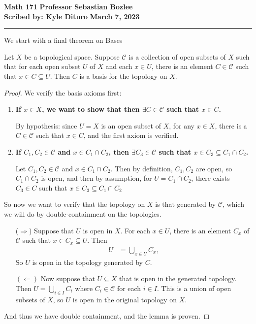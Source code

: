 \documentclass[12pt, twosided]{article}
\begin{document}
\noindent \textbf{Math 171} \hfill \textbf{Professor Sebastian Bozlee} \\
\textbf{Scribed by: Kyle Dituro} \hfill \textbf{March 7, 2023}\hrule
\vspace{.2in}

We start with a final theorem on Bases

\begin{lm}
  Let \(X\) be a topological space. Suppose \(\mathcal{C}\) is a collection of open subsets of \(X\) such that for each open subset \(U\) of \(X\) and each \(x \in U\), there is an element \(C \in \mathcal{C}\) such that \(x \in C \subseteq U\). Then \(C\) is a basis for the topology on \(X\).
\end{lm}
\begin{proof}
  We verify the basis axioms first:
  \begin{enumerate}
  \item \textbf{If \(x \in X\), we want to show that then \(\exists C \in \mathcal{C}\) such that \(x \in C\).}
    
    By hypothesis: since \(U = X\) is an open subset of \(X\), for any \(x \in X\), there is a \(C \in \mathcal{C}\) such that \(x \in C\), and the first axiom is verified.
    
  \item \textbf{If \(C_1, C_2 \in \mathcal{C}\) and \(x \in C_1 \cap C_2\), then \(\exists C_3 \in \mathcal{C}\) such that \(x \in C_3 \subseteq C_1 \cap C_2\).}

    Let \(C_1, C_2 \in \mathcal{C}\) and \(x \in C_1 \cap C_2\). Then by definition, \(C_1, C_2\) are open, so \(C_1 \cap C_2\) is open, and then by assumption, for \(U = C_1 \cap C_2\), there exists \(C_3 \in C\) such that \(x \in C_3 \subseteq C_1 \cap C_2\)
  \end{enumerate} \partdone

  So now we want to verify that the topology on \(X\) is that generated by \(\mathcal{C}\), which we will do by double-containment on the topologies.

  \begin{enumerate}
  \item [(\(\Rightarrow\))] Suppose that \(U\) is open in \(X\). For each \(x \in U\), there is an element \(C_x\) of \(\mathcal{C}\) such that \(x \in C_x \subseteq U\). Then
    \begin{align*}
      U &= \bigcup_{x \in U} C_x,
    \end{align*}
    So \(U\) is open in the topology generated by \(C\).
  \item [\((\Leftarrow)\)] Now suppose that \(U \subseteq X\) that is open in the generated topology. Then \(U = \bigcup_{i \in I} C_i\) where \(C_i \in \mathcal{C}\) for each \(i \in I\). This is a union of open subsets of \(X\), so \(U\) is open in the original topology on \(X\).
  \end{enumerate}
  And thus we have double containment, and the lemma is proven.
\end{proof}
\end{document}
